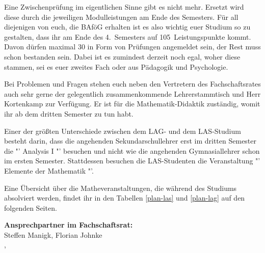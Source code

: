 Eine Zwischenprüfung im eigentlichen Sinne gibt es nicht mehr.
Ersetzt wird diese durch die jeweiligen Modulleistungen am Ende des Semesters.
Für all diejenigen von euch, die BAföG erhalten ist es also wichtig euer Studium so zu gestalten, dass ihr am Ende des 4.~Semesters auf 105~Leistungspunkte kommt.
Davon dürfen maximal 30 in Form von Prüfungen angemeldet sein, der Rest muss schon bestanden sein.
Dabei ist es zumindest derzeit noch egal, woher diese stammen, sei es euer zweites Fach oder aus Pädagogik und Psychologie.

Bei Problemen und Fragen stehen euch neben den Vertretern des Fachschaftsrates auch sehr gerne der gelegentlich zusammenkommende Lehrerstammtisch und Herr Kortenkamp zur Verfügung.
Er ist für die Mathematik-Didaktik zuständig, womit ihr ab dem dritten Semester zu tun habt.

Einer der größten Unterschiede zwischen dem LAG- und dem LAS-Studium besteht darin, dass die angehenden Sekundarschullehrer erst im dritten Semester die "' Analysis I "' besuchen und nicht wie die angehenden Gymnasiallehrer schon im ersten Semester.
Stattdessen besuchen die LAS-Studenten die Veranstaltung "' Elemente der Mathematik "'.

Eine Übersicht über die Matheveranstaltungen, die während des Studiums absolviert werden, findet ihr in den Tabellen \ref{plan-las} und \ref{plan-lag} auf den folgenden Seiten.

\textbf{Ansprechpartner im Fachschaftsrat:}\\
Steffen Manigk, Florian Johnke\\
,\\



\label{studiengang_lehramt}

\label{studiengang_lag}

